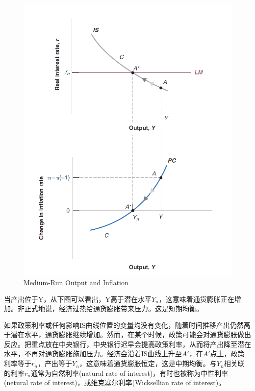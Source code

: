 \documentclass{article}
\begin{document}
\begin{figure}[H] %
	\centering %
	\includegraphics[width=1\textwidth]{9_2} %
	\caption{Medium-Run Output and
		Inflation} %
	\label{Fig.main3} %
\end{figure}

当产出位于Y，从下图可以看出，Y高于潜在水平$ Y_n $，这意味着通货膨胀正在增加。非正式地说，经济过热给通货膨胀带来压力。这是短期均衡。

如果政策利率或任何影响IS曲线位置的变量均没有变化，随着时间推移产出仍然高于潜在水平，通货膨胀继续增加。然而，在某个时候，政策可能会对通货膨胀做出反应。把重点放在中央银行，中央银行迟早会提高政策利率，从而将产出降至潜在水平，不再对通货膨胀施加压力。经济会沿着IS曲线上升至$ A' $，在$ A' $点上，政策利率等于$ r_n $，产出等于$ Y_n $，这意味着通货膨胀恒定，这是中期均衡。与$ Y_n $相关联的利率$ r_n $通常为自然利率(natural rate of interest)，有时也被称为中性利率(netural rate of interest)，或维克塞尔利率(Wicksellian rate of interest)。
\end{document}
